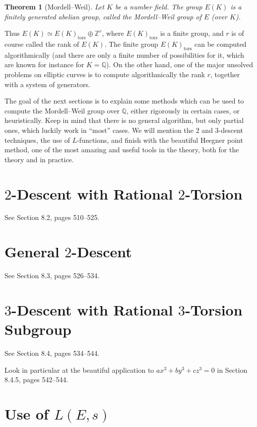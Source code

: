 \documentclass[12pt,a4paper]{article}
\newcommand{\isom}{\simeq}
\newcommand{\op}{{\rm (}}
\newcommand{\cps}{\/{\rm )}}
\newcommand{\Q}{{\mathbb Q}}
\newcommand{\Z}{{\mathbb Z}}
\newtheorem{theorem}{Theorem}[section]
\begin{document}
\begin{theorem}[Mordell--Weil] Let $K$ be a number field. The group $E(K)$
is a finitely generated abelian group, called the Mordell--Weil group
of $E$ \op over $K$\cps.\end{theorem}

Thus $E(K)\isom E(K)_{\text{tors}}\oplus\Z^r$, where $E(K)_{\text{tors}}$
is a finite group, and $r$ is of course called the rank of $E(K)$. The
finite group $E(K)_{\text{tors}}$ can be computed algorithmically (and
there are only a finite number of possibilities for it, which are known
for instance for $K=\Q$). On the other hand, one of the major unsolved
problems on elliptic curves is to compute algorithmically the rank $r$,
together with a system of generators. 

The goal of the next sections is to explain some methods which can be
used to compute the Mordell--Weil group over $\Q$, either rigorously
in certain cases, or heuristically. Keep in mind that there is no general
algorithm, but only partial ones, which luckily work in ``most'' cases.
We will mention the $2$ and $3$-descent techniques, the use of $L$-functions,
and finish with the beautiful Heegner point method, one of the most amazing
and useful tools in the theory, both for the theory and in practice.

\section{$2$-Descent with Rational $2$-Torsion}

See Section 8.2, pages 510--525.

\section{General $2$-Descent}

See Section 8.3, pages 526--534.

\section{$3$-Descent with Rational $3$-Torsion Subgroup}

See Section 8.4, pages 534--544.

Look in particular at the beautiful application to $ax^3+by^3+cz^3=0$ in
Section 8.4.5, pages 542--544.

\section{Use of $L(E,s)$}
\end{document}
